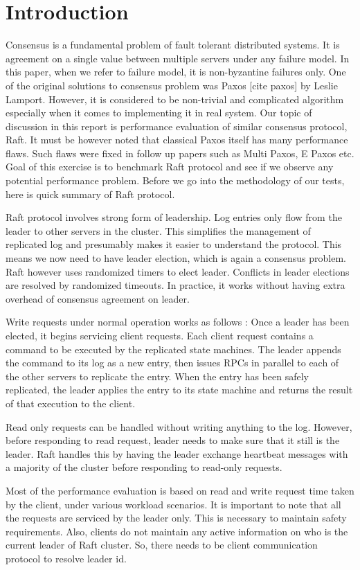 \section{Introduction}
 
Consensus is a fundamental problem of fault tolerant distributed systems. It is agreement on a single value between multiple servers under any failure model. In this paper, when we refer to failure model, it is non-byzantine failures only. One of the original solutions to consensus problem was Paxos [cite paxos] by Leslie Lamport. However, it is considered to be non-trivial and complicated algorithm especially when it comes to implementing it in real system. Our topic of discussion in this report is performance evaluation of similar consensus protocol, Raft. It must be however noted that classical Paxos itself has many performance flaws. Such flaws were fixed in follow up papers such as Multi Paxos, E Paxos etc. Goal of this exercise is to benchmark Raft protocol and see if we observe any potential performance problem. Before we go into the methodology of our tests, here is quick summary of Raft protocol.

Raft protocol involves strong form of leadership. Log entries only flow from the leader to other servers in the cluster. This simplifies the management of replicated log and presumably makes it easier to understand the protocol. This means we now need to have leader election, which is again a consensus problem. Raft however uses randomized timers to elect leader. Conflicts in leader elections are resolved by randomized timeouts. In practice, it works without having extra overhead of consensus agreement on leader. 

Write requests under normal operation works as follows : Once a leader has been elected, it begins servicing client requests. Each client request contains a command to be executed by the replicated state machines. The leader appends the command to its log as a new entry, then issues RPCs in parallel to each of the other servers to replicate the entry. When the entry has been safely replicated, the leader applies the entry to its state machine and returns the result of that execution to the client. 

Read only requests can be handled without writing anything to the log. However, before responding to read request, leader needs to make sure that it still is the leader. Raft handles this by having the leader exchange heartbeat messages with a majority of the cluster before responding to read-only requests.

Most of the performance evaluation is based on read and write request time taken by the client, under various workload scenarios. It is important to note that all the requests are serviced by the leader only. This is necessary to maintain safety requirements. Also, clients do not maintain any active information on who is the current leader of Raft cluster. So, there needs to be client communication protocol to resolve leader id. 
